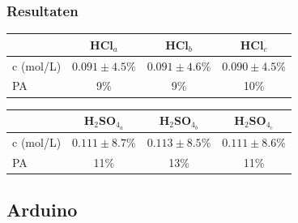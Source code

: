 \documentclass[11pt]{report}
\begin{document}
\subsubsection{Resultaten}
\begin{center}
  \begin{tabular}{|l|c|c|c|}
      \hline
        & HCl$_a$ & HCl$_b$ & HCl$_c$ \\\hline
      c (mol/L) & $0.091\pm4.5\%$ & $0.091\pm4.6\%$ & $0.090\pm4.5\%$ \\\hline
      PA        & 9\% & 9\% & 10\% \\\hline
  \end{tabular}
\end{center}
\begin{center}
  \begin{tabular}{|l|c|c|c|}
      \hline
        & H$_2$SO$_{4_a}$ & H$_2$SO$_{4_b}$ & H$_2$SO$_{4_c}$ \\\hline
      c (mol/L) & $0.111\pm8.7\%$ & $0.113\pm8.5\%$ & $0.111\pm8.6\%$ \\\hline
      PA        & 11\% & 13\% & 11\% \\\hline
  \end{tabular}
\end{center}

\newpage

\subsection{Arduino}
\end{document}
